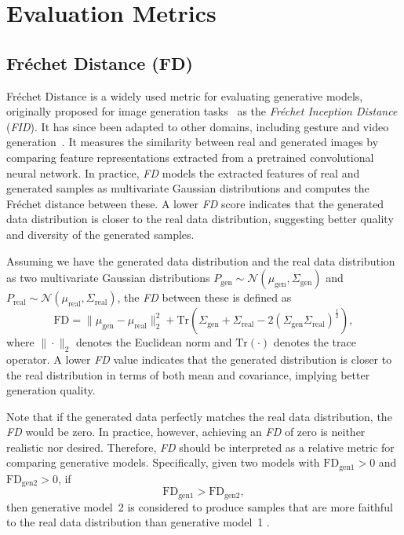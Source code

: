 \documentclass[journal]{IEEEtran}
\begin{document}
\section{Evaluation Metrics}

\subsection{Fr\'echet Distance (FD)}

Fr\'echet Distance is a widely used metric for evaluating generative models, originally proposed for image generation tasks~\cite{frechen_inceptive_distance} as the \textit{Fr\'echet Inception Distance} (\textit{FID}). It has since been adapted to other domains, including gesture and video generation~\cite{maiorcaObjectiveEvaluationMetric2023, wangThisThatLanguageGestureControlled2025}. It measures the similarity between real and generated images by comparing feature representations extracted from a pretrained convolutional neural network. In practice, \textit{FD} models the extracted features of real and generated samples as multivariate Gaussian distributions and computes the Fr\'echet distance \cite{frechet_QuelquesPointsCalcul_1906} between these. A lower \textit{FD} score indicates that the generated data distribution is closer to the real data distribution, suggesting better quality and diversity of the generated samples.

Assuming we have the generated data distribution and the real data distribution as two multivariate Gaussian distributions $P_{\text{gen}} \sim \mathcal{N}(\mu_{\text{gen}}, \Sigma_{\text{gen}})$ and $P_{\text{real}} \sim \mathcal{N}(\mu_{\text{real}}, \Sigma_{\text{real}})$, the \textit{FD} between these is defined as
\begin{equation}\label{eq:FD}
\mathrm{FD} = \|\mu_{\text{gen}} - \mu_{\text{real}}\|_2^2 
+ \mathrm{Tr}\!\left( \Sigma_{\text{gen}} + \Sigma_{\text{real}} 
- 2 \left( \Sigma_{\text{gen}} \Sigma_{\text{real}} \right)^{\frac{1}{2}} \right),
\end{equation}
where $\|\cdot\|_2$ denotes the Euclidean norm and $\mathrm{Tr}(\cdot)$ denotes the trace operator. A lower \textit{FD} value indicates that the generated distribution is closer to the real distribution in terms of both mean and covariance, implying better generation quality. 

Note that if the generated data perfectly matches the real data distribution, the \textit{FD} would be zero. In practice, however, achieving an \textit{FD} of zero is neither realistic nor desired. Therefore, \textit{FD} should be interpreted as a relative metric for comparing generative models. Specifically, given two models with $\mathrm{FD}_{\text{gen1}} > 0$ and $\mathrm{FD}_{\text{gen2}} > 0$, if 
\[
\mathrm{FD}_{\text{gen1}} > \mathrm{FD}_{\text{gen2}},
\]
then generative model~2 is considered to produce samples that are more faithful to the real data distribution than generative model~1 \cite{Ali2025}.
\end{document}
